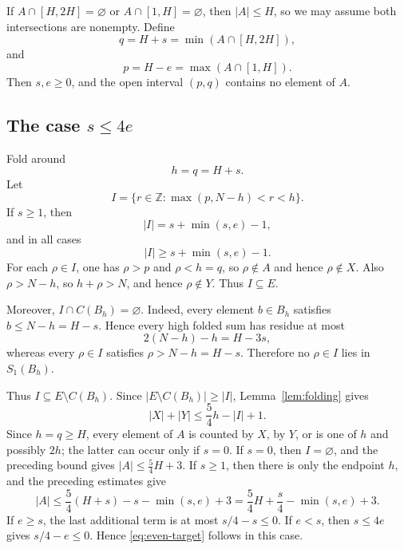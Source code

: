 \documentclass[11pt]{amsart}
\theoremstyle{definition}
\newcommand{\Z}{\mathbb{Z}}
\begin{document}
If $A\cap[H,2H]=\varnothing$ or $A\cap[1,H]=\varnothing$, then $|A|\leq H$, so we may assume both intersections are nonempty. Define
\[
  q=H+s=\min(A\cap[H,2H]),
\]
and
\[
  p=H-e=\max(A\cap[1,H]).
\]
Then $s,e\geq 0$, and the open interval $(p,q)$ contains no element of $A$.

\subsection{The case \texorpdfstring{$s\leq 4e$}{s <= 4e}}
Fold around
\[
  h=q=H+s.
\]
Let
\[
  I=\{r\in\Z:\max(p,N-h)<r<h\}.
\]
If $s\geq 1$, then
\[
  |I|=s+\min(s,e)-1,
\]
and in all cases
\[
  |I|\geq s+\min(s,e)-1.
\]
For each $\rho\in I$, one has $\rho>p$ and $\rho<h=q$, so $\rho\notin A$ and hence $\rho\notin X$. Also $\rho>N-h$, so $h+\rho>N$, and hence $\rho\notin Y$. Thus $I\subseteq E$.

Moreover, $I\cap C(B_h)=\varnothing$. Indeed, every element $b\in B_h$ satisfies $b\leq N-h=H-s$. Hence every high folded sum has residue at most
\[
  2(N-h)-h=H-3s,
\]
whereas every $\rho\in I$ satisfies $\rho>N-h=H-s$. Therefore no $\rho\in I$ lies in $S_1(B_h)$.

Thus $I\subseteq E\setminus C(B_h)$. Since $|E\setminus C(B_h)|\geq |I|$, Lemma~\ref{lem:folding} gives
\[
  |X|+|Y|\leq \frac54h-|I|+1.
\]
Since $h=q\geq H$, every element of $A$ is counted by $X$, by $Y$, or is one of $h$ and possibly $2h$; the latter can occur only if $s=0$. If $s=0$, then $I=\varnothing$, and the preceding bound gives $|A|\leq \frac54H+3$. If $s\geq 1$, then there is only the endpoint $h$, and the preceding estimates give
\[
  |A|\leq \frac54(H+s)-s-\min(s,e)+3
  =\frac54H+\frac s4-\min(s,e)+3.
\]
If $e\geq s$, the last additional term is at most $s/4-s\leq 0$. If $e<s$, then $s\leq 4e$ gives $s/4-e\leq 0$. Hence \eqref{eq:even-target} follows in this case.
\end{document}
